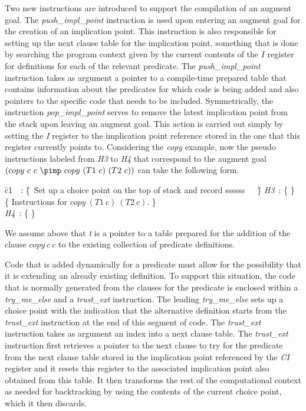 Two new instructions are introduced to support the compilation of an
augment goal. The {\it push\_impl\_point} instruction is used upon
entering an augment goal for the creation of an implication
point. This instruction is also responsible for setting up the next
clause table for the implication point, something that is done by
searching the program context given by the current contents of the $I$
register for definitions for each of the relevant predicate. The {\it
  push\_impl\_point} instruction takes as argument a pointer to a
compile-time prepared table that contains information about the
predicates for which code is being added and also pointers to the
specific code that needs to be included.
Symmetrically, the instruction {\it pop\_impl\_point} serves to remove
the latest implication point from the stack upon leaving an augment
goal. This action is carried out simply by setting the {\it I}
register to the implication point reference stored in the one that
this register currently points to.
Considering the {\it copy} example, now the pseudo instructions labeled from
{\it H3} to {\it H4} that correspond to the augment goal
$(copy\ c\ c\ \pimp \ copy\ (T1\ c)\ (T2\ c))$
can take the following form.
\begin{tabbing}
\quad\= c1\ \ : \=\{\ \=Set up a choice point on the top of stack and record ssssss\ \ \ \=\}\kill
\> {\it H3}\ : \>\{                                                                     \>\} \\
\>             \>\{ \>Instructions for $copy\ (T1\ c)\ (T2\ c)$.                                                 \>\} \\
\> {\it H4}\ : \>\{                                                                      \>\}
\end{tabbing}
We assume above that {\it t} is a pointer to a table prepared for the
addition of the clause $copy\ c\ c$ to the existing collection of
predicate definitions.

Code that is added dynamically for a predicate must allow for the
possibility that it is extending an already existing definition. To
support this situation, the code that is normally generated from the
clauses for the predicate is enclosed within a
{\it try\_me\_else} and a {\it trust\_ext} instruction. The leading
{\it try\_me\_else} sets up a choice point with the indication that
the alternative definition starts from the {\it trust\_ext}
instruction at the end of this segment of code.
The {\it trust\_ext} instruction takes as argument an index into a
next clause table.
The {\it trust\_ext} instruction first retrieves a pointer to the next
clause to try for the predicate from the next clause table stored in
the implication point referenced by the {\it CI} register and it
resets this register to the associated implication point also obtained
from this table. It then transforms the rest of the computational
context as needed for backtracking by using the contents of the
current choice point, which it then discards.


